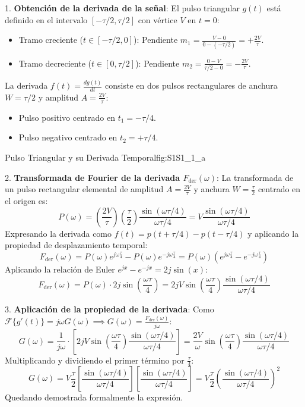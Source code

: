 \begin{resolucion}
1. \textbf{Obtención de la derivada de la señal}:
   El pulso triangular $g(t)$ está definido en el intervalo $[-\tau/2, \tau/2]$ con vértice $V$ en $t=0$:
   \begin{itemize}[leftmargin=*]
       \item Tramo creciente ($t \in [-\tau/2, 0]$): Pendiente $m_1 = \frac{V - 0}{0 - (-\tau/2)} = +\frac{2V}{\tau}$.
       \item Tramo decreciente ($t \in [0, \tau/2]$): Pendiente $m_2 = \frac{0 - V}{\tau/2 - 0} = -\frac{2V}{\tau}$.
   \end{itemize}
   La derivada $f(t) = \frac{dg(t)}{dt}$ consiste en dos pulsos rectangulares de anchura $W = \tau/2$ y amplitud $A = \frac{2V}{\tau}$:
   \begin{itemize}[leftmargin=*]
       \item Pulso positivo centrado en $t_1 = -\tau/4$.
       \item Pulso negativo centrado en $t_2 = +\tau/4$.
   \end{itemize}

%
       {Pulso Triangular y su Derivada Temporal}{fig:S1S1_1_a}

2. \textbf{Transformada de Fourier de la derivada $F_{\text{der}}(\omega)$}:
   La transformada de un pulso rectangular elemental de amplitud $A = \frac{2V}{\tau}$ y anchura $W = \frac{\tau}{2}$ centrado en el origen es:
   \[
   P(\omega) = \left(\frac{2V}{\tau}\right) \left(\frac{\tau}{2}\right) \frac{\sin(\omega\tau/4)}{\omega\tau/4} = V \frac{\sin(\omega\tau/4)}{\omega\tau/4}
   \]
   Expresando la derivada como $f(t) = p(t + \tau/4) - p(t - \tau/4)$ y aplicando la propiedad de desplazamiento temporal:
   \[
   F_{\text{der}}(\omega) = P(\omega) e^{j\omega \frac{\tau}{4}} - P(\omega) e^{-j\omega \frac{\tau}{4}} = P(\omega) \left( e^{j\omega \frac{\tau}{4}} - e^{-j\omega \frac{\tau}{4}} \right)
   \]
   Aplicando la relación de Euler $e^{jx} - e^{-jx} = 2j\sin(x)$:
   \[
   F_{\text{der}}(\omega) = P(\omega) \cdot 2j \sin\left(\frac{\omega\tau}{4}\right) = 2j V \sin\left(\frac{\omega\tau}{4}\right) \frac{\sin(\omega\tau/4)}{\omega\tau/4}
   \]

3. \textbf{Aplicación de la propiedad de la derivada}:
   Como $\mathcal{F}\{g'(t)\} = j\omega G(\omega) \implies G(\omega) = \frac{F_{\text{der}}(\omega)}{j\omega}$:
   \[
   G(\omega) = \frac{1}{j\omega} \cdot \left[ 2j V \sin\left(\frac{\omega\tau}{4}\right) \frac{\sin(\omega\tau/4)}{\omega\tau/4} \right] = \frac{2V}{\omega} \sin\left(\frac{\omega\tau}{4}\right) \frac{\sin(\omega\tau/4)}{\omega\tau/4}
   \]
   Multiplicando y dividiendo el primer término por $\frac{\tau}{4}$:
   \[
   G(\omega) = V \frac{\tau}{2} \left[ \frac{\sin(\omega\tau/4)}{\omega\tau/4} \right] \left[ \frac{\sin(\omega\tau/4)}{\omega\tau/4} \right] = V \frac{\tau}{2} \left( \frac{\sin(\omega\tau/4)}{\omega\tau/4} \right)^2
   \]
   Quedando demostrada formalmente la expresión.
\end{resolucion}

